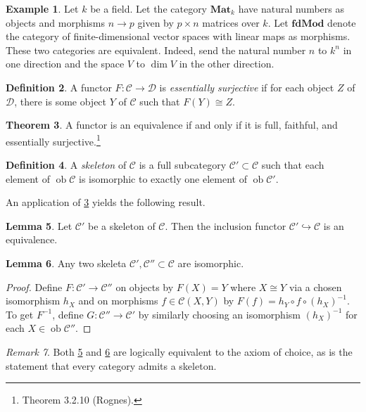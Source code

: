 \documentclass[10pt,letterpaper,cm]{nupset}
\theoremstyle{definition}
\newtheorem{definition}{Definition}[section]
\newtheorem{exmp}[definition]{Example}
\theoremstyle{theorem}
\newtheorem{theorem}[definition]{Theorem}
\newtheorem{lemma}[definition]{Lemma}
\theoremstyle{remark}
\newtheorem{remark}[definition]{Remark}
\newcommand{\1}{\mathbf{1}}
\renewcommand{\c}{\mathscr{C}}
\renewcommand{\d}{\mathscr{D}}
\newcommand{\0}{\vec 0}
\DeclareMathOperator{\ob}{ob}
\begin{document}
\begin{exmp}
Let $k$ be a field. Let the category $\mathbf{Mat}_k$  have natural numbers as objects and morphisms $n \to p$ given by $p \times n$ matrices over $k$. Let $\mathbf{fdMod}$ denote the category of finite-dimensional vector spaces with linear maps as morphisms. These two categories are equivalent. Indeed, send the natural number $n$ to $k^n$ in one direction and the space $V$ to $\dim V$ in the other direction.    
\end{exmp}


\begin{definition}
A functor $F : \c \to \d$ is \textit{essentially surjective} if for each object $Z$ of  $\d$, there is some object $Y$ of $\c$ such that $F(Y) \cong Z$.
\end{definition}

\begin{theorem}\label{equiv}
A functor is an equivalence if and only if it is full, faithful, and essentially surjective.\footnote{Theorem 3.2.10 (Rognes).}
\end{theorem}


\begin{definition}
A \textit{skeleton} of $\c$ is a full subcategory $\c' \subset \c$ such that each element of $\ob \c$ is isomorphic to exactly one element of $\ob \c'$.
\end{definition}

An application of \cref{equiv} yields the following result.

\begin{lemma}\label{e1}
Let $\c'$ be a skeleton of $\c$. Then the inclusion functor  $\c' \hookrightarrow \c$ is an equivalence.
\end{lemma}

\smallskip

\begin{lemma}\label{e2}
Any two skeleta $\c', \c'' \subset \c$ are isomorphic.
\end{lemma}
\begin{proof}
Define $F: \c' \to \c''$ on objects by $F(X) =Y$ where $X\cong Y$ via a chosen isomorphism $h_X$ and on morphisms $f\in \c(X, Y)$ by $F(f) = h_Y \circ f \circ (h_X)^{{-1}}$.
To get $F^{{-1}}$,  define $G: \c'' \to \c'$ by similarly choosing an isomorphism $\left(h_X\right)^{{-1}}$ for each $X\in \ob{\c''}$.
\end{proof}

\begin{remark}
Both \cref{e1} and \cref{e2} are logically equivalent to the axiom of choice, as is the statement that every category admits a skeleton.
\end{remark}
\end{document}

